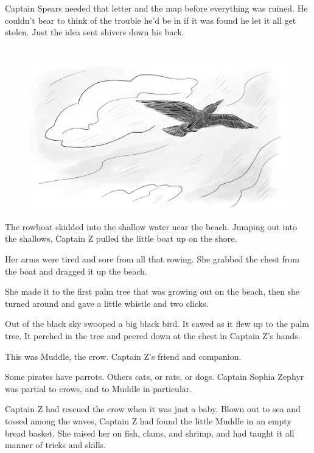 \documentclass[12pt]{extbook}
\begin{document}
  Captain Spears needed that letter and the map before everything was
  ruined. He couldn't bear to think of the trouble he'd be in if it was
  found he let it all get stolen. Just the idea sent shivers down his
  back.
  
  \section{}\label{section-10}
  
  \begin{figure}[htbp]
  \centering
  \includegraphics{img/muddle.png}
  \caption{}
  \end{figure}
  
  The rowboat skidded into the shallow water near the beach. Jumping out
  into the shallows, Captain Z pulled the little boat up on the shore.
  
  Her arms were tired and sore from all that rowing. She grabbed the chest
  from the boat and dragged it up the beach.
  
  She made it to the first palm tree that was growing out on the beach,
  then she turned around and gave a little whistle and two clicks.
  
  Out of the black sky swooped a big black bird. It cawed as it flew up to
  the palm tree. It perched in the tree and peered down at the chest in
  Captain Z's hands.
  
  This was Muddle, the crow. Captain Z's friend and companion.
  
  Some pirates have parrots. Others cats, or rats, or dogs. Captain Sophia
  Zephyr was partial to crows, and to Muddle in particular.
  
  Captain Z had rescued the crow when it was just a baby. Blown out to sea
  and tossed among the waves, Captain Z had found the little Muddle in an
  empty bread basket. She raised her on fish, clams, and shrimp, and had
  taught it all manner of tricks and skills.
  
\end{document}
